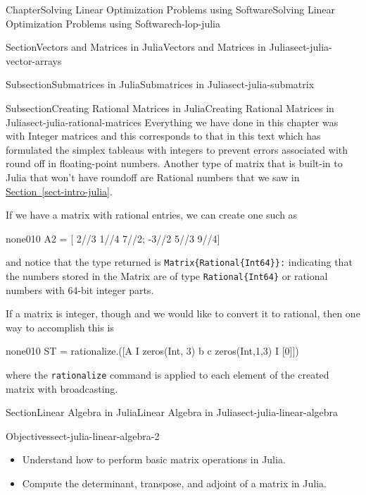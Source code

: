 \documentclass[oneside,10pt,]{book}
\newcommand{\xreffont}{\relax}
\newcommand{\mono}[1]{\texttt{#1}}
\numberwithin{equation}{section}
\begin{document}
\begin{chapterptx}{Chapter}{Solving Linear Optimization Problems using Software}{}{Solving Linear Optimization Problems using Software}{}{}{ch-lop-julia}
\begin{sectionptx}{Section}{Vectors and Matrices in Julia}{}{Vectors and Matrices in Julia}{}{}{sect-julia-vector-arrays}
\begin{subsectionptx}{Subsection}{Submatrices in Julia}{}{Submatrices in Julia}{}{}{sect-julia-submatrix}
%
\end{subsectionptx}
%
%
\typeout{************************************************}
\typeout{************************************************}
%
\begin{subsectionptx}{Subsection}{Creating Rational Matrices in Julia}{}{Creating Rational Matrices in Julia}{}{}{sect-julia-rational-matrices}
Everything we have done in this chapter was with Integer matrices and this corresponds to that in this text which has formulated the simplex tableaus with integers to prevent errors associated with round off in floating-point numbers. Another type of matrix that is built-in to Julia that won't have roundoff are Rational numbers that we saw in \hyperref[sect-intro-julia]{Section~{\xreffont\ref{sect-intro-julia}}}.%
\par
If we have a matrix with rational entries, we can create one such as%
\begin{program}{none}{0}{1}{0}
A2 = [ 2//3 1//4 7//2; -3//2 5//3 9//4]
\end{program}
and notice that the type returned is \mono{Matrix\{Rational\{Int64\}\}:} indicating that the numbers stored in the Matrix are of type \mono{Rational\{Int64\}} or rational numbers with 64-bit integer parts.%
\par
If a matrix is integer, though and we would like to convert it to rational, then one way to accomplish this is%
\begin{program}{none}{0}{1}{0}
ST = rationalize.([A I zeros(Int, 3) b
  c zeros(Int,1,3) I [0]])
\end{program}
where the \mono{rationalize} command is applied to each element of the created matrix with broadcasting.%
\end{subsectionptx}
\end{sectionptx}
%
%
\typeout{************************************************}
\typeout{************************************************}
%
\begin{sectionptx}{Section}{Linear Algebra in Julia}{}{Linear Algebra in Julia}{}{}{sect-julia-linear-algebra}
\begin{objectives}{Objectives}{sect-julia-linear-algebra-2}
%
\begin{itemize}[label=\textbullet]
\item{}Understand how to perform basic matrix operations in Julia.%
\item{}Compute the determinant, transpose, and adjoint of a matrix in Julia.%

\end{itemize}
\end{objectives}
\end{sectionptx}
\end{chapterptx}
\end{document}
